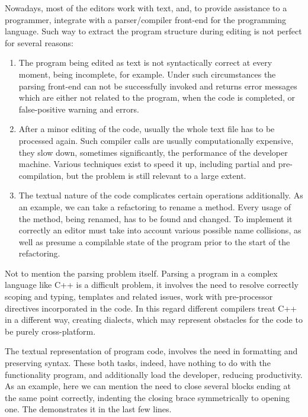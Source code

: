 Nowadays, most of the editors work with text, and, to provide assistance to a programmer, integrate
with a parser/compiler front-end for the programming language. Such way to extract the program
structure during editing is not perfect for several reasons:

\begin{enumerate}
 \item The program being edited as text is not syntactically correct at every moment, 
being incomplete, for example. Under such circumstances the parsing front-end can not be
successfully invoked and returns error messages which are either not related to the program, when
the code is completed, or false-positive warning and errors. 
  
 \item After a minor editing of the code, usually the whole text file has to be processed again. Such compiler calls are usually 
computationally expensive, they slow down, sometimes significantly, the performance of the developer machine. Various techniques exist to speed it up, including partial 
and pre- compilation, but the problem is still relevant to a large extent. 

\item The textual nature of the code complicates certain operations additionally. As an example, we can take a refactoring
to rename a method. Every usage of the method, being renamed, has to be found and changed. To implement it correctly an editor must take into account various possible name collisions, as well 
as presume a compilable state of the program prior to the start of the refactoring.

\end{enumerate}

Not to mention the parsing problem itself. Parsing a program in a complex language like C++ is a difficult problem, it involves 
the need to resolve correctly scoping and typing, templates and related issues, work with pre-processor directives incorporated
in the code. In this regard different compilers treat C++ in a different way, creating dialects, which may represent obstacles for
the code to be purely cross-platform.


The textual representation of program code, involves the need in formatting and preserving syntax. These both tasks, indeed,  have nothing to do with the functionality program, and additionally 
load the developer, reducing productivity. As an example, here we can mention the need to close
several blocks ending at the same point correctly, indenting the closing brace symmetrically 
to opening one. The  demonstrates it in the last few lines.

